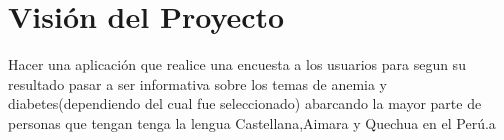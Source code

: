 \chapter{Visión del Proyecto}
Hacer una aplicación que realice una encuesta a los usuarios para segun su resultado pasar a ser  informativa sobre los temas de anemia
y diabetes(dependiendo del cual fue seleccionado) abarcando la mayor parte de personas que tengan
tenga la lengua Castellana,Aimara y Quechua en el Perú.a